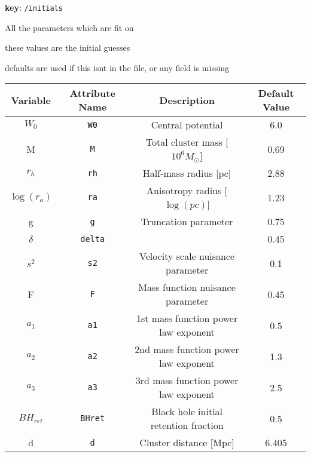 
\textbf{key}: \texttt{/initials}

All the parameters which are fit on

these values are the initial guesses

defaults are used if this isnt in the file, or any field is missing


\begin{center}
\begin{tabular}{ | c | c | c | c | }
    \hline
    Variable & Attribute Name & Description & Default Value \\
    \hline\hline
    \(W_0\) & \texttt{W0} & Central potential & 6.0 \\
    \hline
    M & \texttt{M} & Total cluster mass [\(10^6 M_{\odot}\)] & 0.69 \\
    \hline
    \(r_h\) & \texttt{rh} & Half-mass radius [pc] & 2.88 \\
    \hline
    \(\log(r_a)\) & \texttt{ra} & Anisotropy radius [\(\log(pc)\)] & 1.23 \\
    \hline
    g & \texttt{g} & Truncation parameter & 0.75 \\
    \hline
    \(\delta\) & \texttt{delta} & & 0.45 \\
    \hline
    \(s^2\) & \texttt{s2} & Velocity scale nuisance parameter & 0.1 \\
    \hline
    F & \texttt{F} & Mass function nuisance parameter & 0.45 \\
    \hline
    \(a_1\) & \texttt{a1} & 1st mass function power law exponent & 0.5 \\
    \hline
    \(a_2\) & \texttt{a2} & 2nd mass function power law exponent & 1.3 \\
    \hline
    \(a_3\) & \texttt{a3} & 3rd mass function power law exponent & 2.5 \\
    \hline
    \(BH_{ret}\)&\texttt{BHret} & Black hole initial retention fraction & 0.5 \\
    \hline
    d & \texttt{d} & Cluster distance [Mpc] & 6.405 \\
    \hline
\end{tabular}
\end{center}